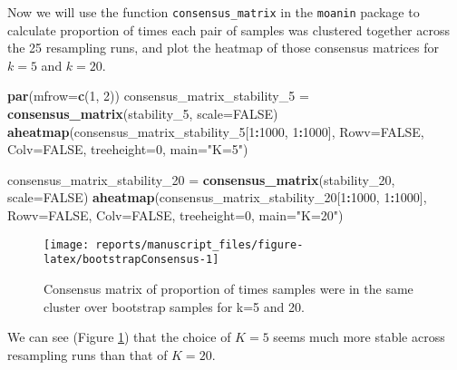 \documentclass[9pt,a4paper,]{extarticle}
\newenvironment{Shaded}{\begin{snugshade}}{\end{snugshade}}
\newcommand{\DataTypeTok}[1]{\textcolor[rgb]{0.13,0.29,0.53}{#1}}
\newcommand{\DecValTok}[1]{\textcolor[rgb]{0.00,0.00,0.81}{#1}}
\newcommand{\KeywordTok}[1]{\textcolor[rgb]{0.13,0.29,0.53}{\textbf{#1}}}
\newcommand{\NormalTok}[1]{#1}
\newcommand{\OperatorTok}[1]{\textcolor[rgb]{0.81,0.36,0.00}{\textbf{#1}}}
\newcommand{\OtherTok}[1]{\textcolor[rgb]{0.56,0.35,0.01}{#1}}
\newcommand{\StringTok}[1]{\textcolor[rgb]{0.31,0.60,0.02}{#1}}
\begin{document}
Now we will use the function \texttt{consensus\_matrix} in the \texttt{moanin} package to
calculate proportion of times each pair of samples was clustered together
across the 25 resampling runs, and plot the heatmap of those consensus
matrices for \(k=5\) and \(k=20\).

\begin{Shaded}
\begin{Highlighting}[]
\KeywordTok{par}\NormalTok{(}\DataTypeTok{mfrow=}\KeywordTok{c}\NormalTok{(}\DecValTok{1}\NormalTok{, }\DecValTok{2}\NormalTok{))}
\NormalTok{consensus_matrix_stability_}\DecValTok{5}\NormalTok{ =}\StringTok{ }\KeywordTok{consensus_matrix}\NormalTok{(stability_}\DecValTok{5}\NormalTok{,}
                        \DataTypeTok{scale=}\OtherTok{FALSE}\NormalTok{)}
\KeywordTok{aheatmap}\NormalTok{(consensus_matrix_stability_}\DecValTok{5}\NormalTok{[}\DecValTok{1}\OperatorTok{:}\DecValTok{1000}\NormalTok{, }\DecValTok{1}\OperatorTok{:}\DecValTok{1000}\NormalTok{], }\DataTypeTok{Rowv=}\OtherTok{FALSE}\NormalTok{,}
     \DataTypeTok{Colv=}\OtherTok{FALSE}\NormalTok{,}
     \DataTypeTok{treeheight=}\DecValTok{0}\NormalTok{, }\DataTypeTok{main=}\StringTok{"K=5"}\NormalTok{)}

\NormalTok{consensus_matrix_stability_}\DecValTok{20}\NormalTok{ =}\StringTok{ }\KeywordTok{consensus_matrix}\NormalTok{(stability_}\DecValTok{20}\NormalTok{,}
                         \DataTypeTok{scale=}\OtherTok{FALSE}\NormalTok{)}
\KeywordTok{aheatmap}\NormalTok{(consensus_matrix_stability_}\DecValTok{20}\NormalTok{[}\DecValTok{1}\OperatorTok{:}\DecValTok{1000}\NormalTok{, }\DecValTok{1}\OperatorTok{:}\DecValTok{1000}\NormalTok{], }\DataTypeTok{Rowv=}\OtherTok{FALSE}\NormalTok{,}
     \DataTypeTok{Colv=}\OtherTok{FALSE}\NormalTok{,}
     \DataTypeTok{treeheight=}\DecValTok{0}\NormalTok{, }\DataTypeTok{main=}\StringTok{"K=20"}\NormalTok{)}
\end{Highlighting}
\end{Shaded}

\begin{figure}[H]

{\centering \texttt{[image: reports/manuscript\_files/figure-latex/bootstrapConsensus-1]} 

}

\caption{Consensus matrix of proportion of times samples were in the same cluster over bootstrap samples for k=5 and 20.}\label{fig:bootstrapConsensus}
\end{figure}

We can see (Figure \ref{fig:bootstrapConsensus}) that the choice of \(K=5\) seems much more stable across resampling runs than that of \(K=20\).
\end{document}
